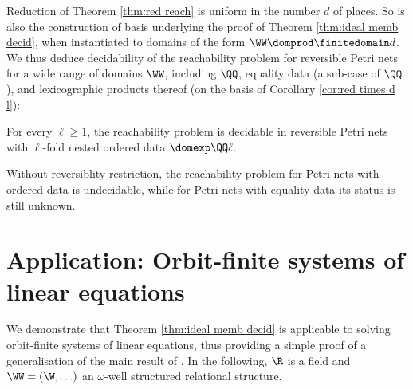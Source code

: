 Reduction of Theorem %
\ref{thm:red reach} is uniform in the number $d$ of places. 
So is also the construction of \Gr basis underlying the proof of
Theorem \ref{thm:ideal memb decid}, when 
instantiated to domains of the form $\WW \domprod \finitedomain d$.
We thus deduce decidability of 
the reachability problem for reversible Petri nets  for a wide range of 
domains $\WW$, including $\QQ$, equality data
(a sub-case of $\QQ$), and lexicographic
products %
thereof (on the basis of Corollary \ref{cor:red times d l}):
%
\begin{theorem}\label{thm:red reach l}
For every $\ell\geq 1$,
the reachability problem is decidable in reversible Petri nets with 
$\ell$-fold nested ordered data $\domexp \QQ \ell$. 
\end{theorem}
%
\begin{remark} \rm
Without reversiblity restriction, the reachability problem for Petri nets with ordered data 
is undecidable, while for Petri nets with equality data its status is still unknown.
\end{remark}


\section{Application: Orbit-finite systems of linear equations} 
\label{sec:eq}

We demonstrate that
Theorem \ref{thm:ideal memb decid} is applicable to solving orbit-finite systems of linear equations,
thus providing a simple proof of a generalisation of the main result of \cite{GHL22}.
In the following, $\R$ is a field and $\WW = (\W, \ldots)$ an $\omega$-well structured 
relational structure.


